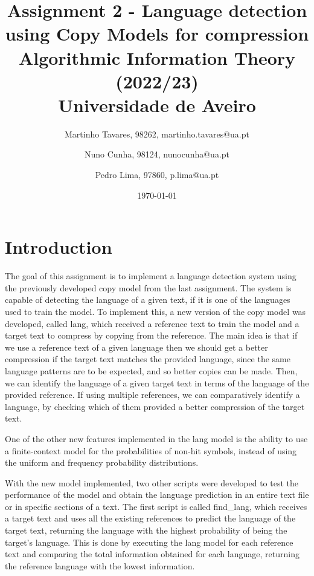 \documentclass{article}
\begin{document}
\title{
    Assignment 2 - Language detection using Copy Models for compression \\
    \large{Algorithmic Information Theory (2022/23) \\
    Universidade de Aveiro}
}

\author{
    Martinho Tavares, 98262, martinho.tavares@ua.pt \and
    Nuno Cunha, 98124, nunocunha@ua.pt \and
    Pedro Lima, 97860, p.lima@ua.pt
}

\date{\today}
\maketitle

\section{Introduction}
\label{sec:introduction}

The goal of this assignment is to implement a language detection system using the previously developed copy model from the last assignment.
The system is capable of detecting the language of a given text, if it is one of the languages used to train the model.
To implement this, a new version of the copy model was developed, called lang, which received a reference text to train the model and a target text to compress by copying from the reference.
The main idea is that if we use a reference text of a given language then we should get a better compression if the target text matches the provided language, since the same language patterns are to be expected, and so better copies can be made.
Then, we can identify the language of a given target text in terms of the language of the provided reference.
If using multiple references, we can comparatively identify a language, by checking which of them provided a better compression of the target text.

One of the other new features implemented in the lang model is the ability to use a finite-context model for the probabilities of non-hit symbols, instead of using the uniform and frequency probability distributions.

With the new model implemented, two other scripts were developed to test the performance of the model and obtain the language prediction in an entire text file or in specific sections of a text.
The first script is called find_lang, which receives a target text and uses all the existing references to predict the language of the target text, returning the language with the highest probability of being the target's language.
This is done by executing the lang model for each reference text and comparing the total information obtained for each language, returning the reference language with the lowest information.
\end{document}
